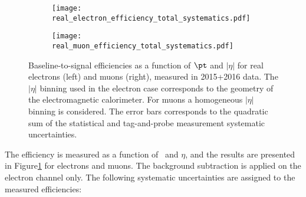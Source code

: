 \begin{figure}[htb!]
\centering
\begin{subfigure}{0.49\textwidth}
\texttt{[image: real\_electron\_efficiency\_total\_systematics.pdf]}
\end{subfigure}
\begin{subfigure}{0.49\textwidth}
\texttt{[image: real\_muon\_efficiency\_total\_systematics.pdf]}
\end{subfigure}
\caption{Baseline-to-signal efficiencies as a function of $\pt$ and $|\eta|$ for real electrons (left) and muons (right), measured in 2015+2016 data.
The $|\eta|$ binning used in the electron case corresponds to the geometry of the electromagnetic calorimeter.
For muons a homogeneous $|\eta|$ binning is considered.
The error bars corresponds to the quadratic sum of the statistical and tag-and-probe measurement systematic uncertainties.}
\label{fig:prompt_leptons_eff}
\end{figure}

The efficiency is measured as a function of \pt\ and $\eta$, and the results are presented in Figure\ref{fig:prompt_leptons_eff} for electrons and muons. 
The background subtraction is applied on the electron channel only. 
The following systematic uncertainties are assigned to the measured efficiencies: 


